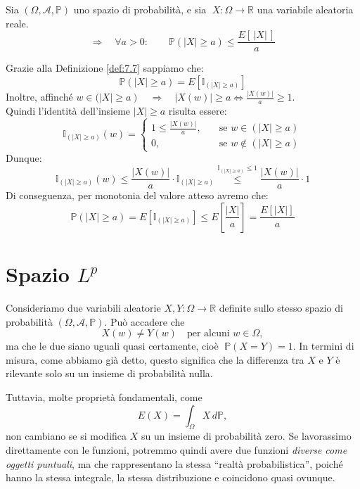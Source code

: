 \begin{teorema}
\label{th:dismark}
    Sia $(\Omega, \mathcal{A}, \mathbb{P})$ uno spazio di probabilità, e sia $\;X:\Omega\to\mathbb{R}$ una variabile aleatoria reale.
    \[\Rightarrow\quad \forall a>0:\qquad \boxed{\mathbb{P}\left(|X|\geq a\right)\leq \frac{E[\,|X|\,]}{a}}\]
    \begin{dimostrazione}
        Grazie alla Definizione \ref{def:7.7} sappiamo che:
        \[\mathbb{P}(|X|\geq a) = E\left[\mathbb{I}_{(|X|\geq a)}\right]\]
        Inoltre, affinché $w \in (\left|X|\geq a\right) \quad \Rightarrow \quad |X(w)|\geq a \iff \frac{|X(w)|}{a}\geq 1$. \\
        Quindi l'identità dell'insieme $|X|\geq a$ risulta essere:
        \[\mathbb{I}_{(|X|\geq a)}(w) = \begin{cases}
            1\leq \frac{|X(w)|}{a}, \quad &\text{se } w\in(|X|\geq a)\\
            0, &\text{se } w\notin(|X|\geq a)
        \end{cases}\]
        Dunque:
        \[\mathbb{I}_{(|X|\geq a)}(w) \leq \frac{|X(w)|}{a}\cdot\mathbb{I}_{(|X|\geq a)}\overset{\mathbb{I}_{(|X|\geq a)}\leq 1}{\leq} \frac{|X(w)|}{a}\cdot 1\]
        Di conseguenza, per monotonia del valore atteso avremo che:
        \[\mathbb{P}(|X|\geq a) = E[\mathbb{I}_{(|X|\geq a)}]\leq E\left[\frac{|X|}{a}\right] = \frac{E[|X|]}{a}\]
    \end{dimostrazione}
\end{teorema}

\section{Spazio $L^p$}

Consideriamo due variabili aleatorie $X, Y : \Omega \to \mathbb{R}$ definite sullo stesso spazio di probabilità $(\Omega, \mathcal{A}, \mathbb{P})$.  
Può accadere che
\[
X(w) \neq Y(w) \quad \text{per alcuni } w \in \Omega,
\]
ma che le due siano uguali quasi certamente, cioè \(\;\mathbb{P}(X = Y) = 1.\)
In termini di misura, come abbiamo già detto, questo significa che la differenza tra $X$ e $Y$ è rilevante solo su un insieme di probabilità nulla.

\medskip
\noindent
Tuttavia, molte proprietà fondamentali, come
\[
E(X) = \int_\Omega X\,d\mathbb{P},
\]
non cambiano se si modifica $X$ su un insieme di probabilità zero.  
Se lavorassimo direttamente con le funzioni, potremmo quindi avere due funzioni \emph{diverse come oggetti puntuali}, ma che rappresentano la stessa ``realtà probabilistica'', poiché hanno la stessa integrale, la stessa distribuzione e coincidono quasi ovunque.

